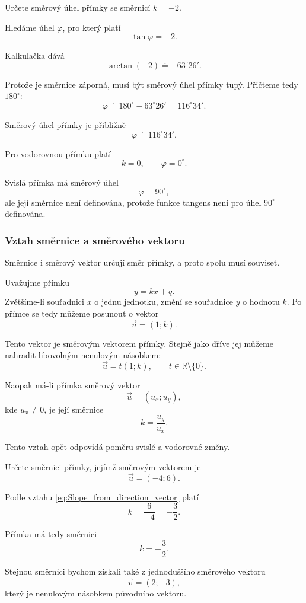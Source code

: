 \begin{example}\label{exa:Direction_angle_from_slope}
    Určete směrový úhel přímky se směrnicí $k=-2$.

    Hledáme úhel $\varphi$, pro který platí
    \[
        \tan\varphi=-2.
    \]

    Kalkulačka dává
    \[
        \arctan(-2)\doteq-63^\circ26'.
    \]

    Protože je směrnice záporná, musí být směrový úhel přímky tupý.
    Přičteme tedy $180^\circ$:
    \[
        \varphi
        \doteq
        180^\circ-63^\circ26'
        =
        116^\circ34'.
    \]

    Směrový úhel přímky je přibližně
    \[
        \varphi\doteq116^\circ34'.
    \]
\end{example}

Pro vodorovnou přímku platí
\[
    k=0,
    \qquad
    \varphi=0^\circ.
\]

Svislá přímka má směrový úhel
\[
    \varphi=90^\circ,
\]
ale její směrnice není definována, protože funkce tangens není pro
úhel $90^\circ$ definována.

\subsubsection{Vztah směrnice a směrového vektoru}
\label{subsubsec:Slope_direction_vector}

Směrnice i směrový vektor určují směr přímky, a proto spolu musí
souviset.

Uvažujme přímku
\[
    y=kx+q.
\]
Zvětšíme-li souřadnici $x$ o jednu jednotku, změní se souřadnice $y$
o hodnotu $k$. Po přímce se tedy můžeme posunout o vektor
\begin{equation}\label{eq:Direction_vector_from_slope}
    \vec{u}=(1;k).
\end{equation}

Tento vektor je směrovým vektorem přímky. Stejně jako dříve jej můžeme
nahradit libovolným nenulovým násobkem:
\[
    \vec{u}=t(1;k),
    \qquad
    t\in\mathbb{R}\setminus\{0\}.
\]

Naopak má-li přímka směrový vektor
\[
    \vec{u}=(u_x;u_y),
\]
kde $u_x\neq0$, je její směrnice
\begin{equation}\label{eq:Slope_from_direction_vector}
    k=\frac{u_y}{u_x}.
\end{equation}

Tento vztah opět odpovídá poměru svislé a vodorovné změny.

\begin{example}\label{exa:Slope_from_direction_vector}
    Určete směrnici přímky, jejímž směrovým vektorem je
    \[
        \vec{u}=(-4;6).
    \]

    Podle vztahu \eqref{eq:Slope_from_direction_vector} platí
    \[
        k
        =
        \frac{6}{-4}
        =
        -\frac{3}{2}.
    \]

    Přímka má tedy směrnici
    \[
        k=-\frac{3}{2}.
    \]

    Stejnou směrnici bychom získali také z jednoduššího směrového
    vektoru
    \[
        \vec{v}=(2;-3),
    \]
    který je nenulovým násobkem původního vektoru.
\end{example}

